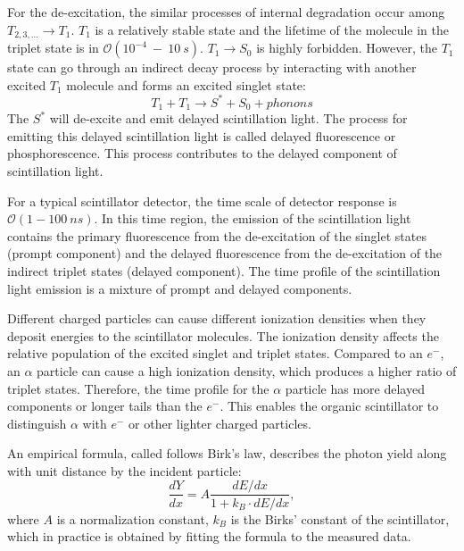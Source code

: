 For the de-excitation, the similar processes of internal degradation occur among $T_{2,3, ...} \to T_1$. $T_1$ is a relatively stable state and the lifetime of the molecule in the triplet state is in $\mathcal{O}(10^{-4}~-~10~s)$\cite{mcquarrie1997physical}. $T_1\to S_0$ is highly forbidden. However, the $T_1$ state can go through an indirect decay process by interacting with another excited $T_1$ molecule and forms an excited singlet state:
\[
T_1+T_1\to S^*+S_0+phonons
\]
The $S^*$ will de-excite and emit delayed scintillation light. The process for emitting this delayed scintillation light is called delayed fluorescence or phosphorescence\cite{leo2012techniques}. This process contributes to the delayed component of scintillation light.

For a typical scintillator detector, the time scale of detector response is $\mathcal{O}(1-100~ns)$. In this time region, the emission of the scintillation light contains the primary fluorescence from the de-excitation of the singlet states (prompt component) and the delayed fluorescence from the de-excitation of the indirect triplet states (delayed component)\cite{dunger2018topological}. The time profile of the scintillation light emission is a mixture of prompt and delayed components. 

Different charged particles can cause different ionization densities when they deposit energies to the scintillator molecules. The ionization density affects the relative population of the excited singlet and triplet states. Compared to an $e^-$, an $\alpha$ particle can cause a high ionization density, which produces a higher ratio of triplet states. Therefore, the time profile for the $\alpha$ particle has more delayed components or longer tails than the $e^-$. This enables the organic scintillator to distinguish $\alpha$ with $e^-$ or other lighter charged particles\cite{dunger2018topological, scintillatorPaper}. 

An empirical formula, called follows Birk's law\cite{birks1951scintillations, birks1965theory}, describes the photon yield along with unit distance by the incident particle:
\[
\frac{dY}{dx}=A\frac{dE/dx}{1+k_B\cdot dE/dx},
\]
where $A$ is a normalization constant, $k_B$ is the Birks' constant of the scintillator, which in practice is obtained by fitting the formula to the measured data.

